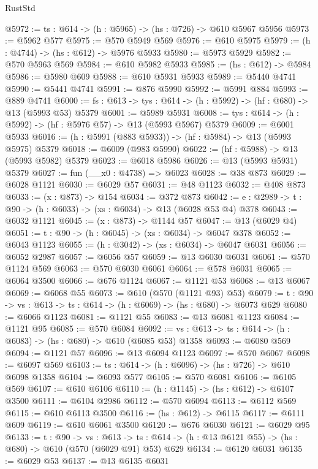 \begin{lexlean}{RustStd}
\begin{coremodule}
@5972 := {ts : @614} -> (h : @5965) -> (hs : @726) -> @610 @5967 @5956
@5973 := @5962 @577
@5975 := @570 @5949 @569
@5976 := @610 @5975
@5979 := (h : @4744) -> (hs : @612) -> @5976 @5933
@5980 := @5973 @5929
@5982 := @570 @5963 @569
@5984 := @610 @5982 @5933
@5985 := (hs : @612) -> @5984
@5986 := @5980 @609
@5988 := @610 @5931 @5933
@5989 := @5440 @4741
@5990 := @5441 @4741
@5991 := @876 @5990
@5992 := @5991 @884
@5993 := @889 @4741
@6000 := {fs : @613} -> {tys : @614} -> (h : @5992) -> (hf : @680) -> @13 (@5993 @53) @5379
@6001 := @5989 @5931
@6008 := {tys : @614} -> (h : @5992) -> (hf : @5976 @57) -> @13 (@5993 @5967) @5379
@6009 := @6001 @5933
@6016 := (h : @5991 (@883 @5933)) -> (hf : @5984) -> @13 (@5993 @5975) @5379
@6018 := @6009 (@983 @5990)
@6022 := (hf : @5988) -> @13 (@5993 @5982) @5379
@6023 := @6018 @5986
@6026 := @13 (@5993 @5931) @5379
@6027 := fun (__x0 : @4738) => @6023
@6028 := @38 @873
@6029 := @6028 @1121
@6030 := @6029 @57
@6031 := @48 @1123
@6032 := @408 @873
@6033 := (x : @873) -> @154
@6034 := @372 @873
@6042 := {e : @2989} -> {t : @90} -> (h : @6033) -> (xs : @6034) -> @13 (@6028 @53 @4) @378
@6043 := @6032 @1121
@6045 := (x : @873) -> @1144 @57
@6047 := @13 (@6029 @4)
@6051 := {t : @90} -> (h : @6045) -> (xs : @6034) -> @6047 @378
@6052 := @6043 @1123
@6055 := (h : @3042) -> (xs : @6034) -> @6047 @6031
@6056 := @6052 @2987
@6057 := @6056 @57
@6059 := @13 @6030 @6031
@6061 := @570 @1124 @569
@6063 := @570 @6030 @6061
@6064 := @578 @6031
@6065 := @6064 @3500
@6066 := @676 @1124
@6067 := @1121 @53
@6068 := @13 @6067
@6069 := @6068 @55
@6073 := @610 (@570 (@1121 @93) @53)
@6079 := {t : @90} -> {vs : @613} -> {ts : @614} -> (h : @6069) -> (hs : @680) -> @6073 @629
@6080 := @6066 @1123
@6081 := @1121 @55
@6083 := @13 @6081 @1123
@6084 := @1121 @95
@6085 := @570 @6084
@6092 := {vs : @613} -> {ts : @614} -> (h : @6083) -> (hs : @680) -> @610 (@6085 @53) @1358
@6093 := @6080 @569
@6094 := @1121 @57
@6096 := @13 @6094 @1123
@6097 := @570 @6067
@6098 := @6097 @569
@6103 := {ts : @614} -> (h : @6096) -> (hs : @726) -> @610 @6098 @1358
@6104 := @6093 @577
@6105 := @570 @6081
@6106 := @6105 @569
@6107 := @610 @6106
@6110 := (h : @1145) -> (hs : @612) -> @6107 @3500
@6111 := @6104 @2986
@6112 := @570 @6094
@6113 := @6112 @569
@6115 := @610 @6113 @3500
@6116 := (hs : @612) -> @6115
@6117 := @6111 @609
@6119 := @610 @6061 @3500
@6120 := @676 @6030
@6121 := @6029 @95
@6133 := {t : @90} ->
  {vs : @613} ->
  {ts : @614} -> (h : @13 @6121 @55) -> (hs : @680) -> @610 (@570 (@6029 @91) @53) @629
@6134 := @6120 @6031
@6135 := @6029 @53
@6137 := @13 @6135 @6031

\end{coremodule}
\end{lexlean}
